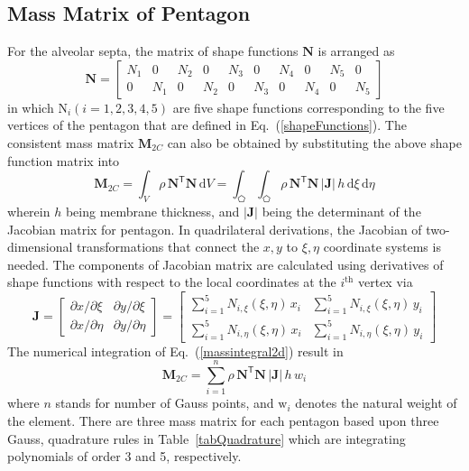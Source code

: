 \subsection{Mass Matrix of Pentagon}
For the alveolar septa, the matrix of shape functions $\mathbf{N}$ is arranged as
 \begin{equation}
	\mathbf{N} = 
	\begin{bmatrix}
	N_1 & 0 & N_2 & 0 & N_3 & 0 & N_4 & 0 & N_5 & 0 \\ 0 & N_1 & 0 & N_2 & 0 & N_3 & 0 & N_4 & 0 & N_5 
\end{bmatrix} 
	\label{shape2D}
\end{equation}
in which $\mathrm{N}_i (i = 1, 2, 3, 4, 5)$ are five shape functions corresponding to the five vertices of the pentagon that are defined in Eq.~(\ref{shapeFunctions}).
The consistent mass matrix $\mathbf{M}_{2C}$ can also be obtained by substituting the above shape function matrix into 
\begin{equation}
    \mathbf{M}_{2C} = \int_{V} \rho \, \mathbf{N}^{\mathsf{T}} \mathbf{N} \, \mathrm{d} V = \int_{\pentagon} \int_{\pentagon} \rho \, \mathbf{N}^{\mathsf{T}} \mathbf{N} \,|\mathbf{J}| \, h \, \mathrm{d} \xi \, \mathrm{d} \eta
    \label{massintegral2d}
\end{equation}
wherein $h$ being membrane thickness, and $|\mathbf{J}|$ being the determinant of the Jacobian matrix for pentagon. 
In quadrilateral derivations,  the Jacobian of two-dimensional transformations that connect the ${x, y}$ to ${\xi, \eta}$ coordinate systems is needed. The components of Jacobian matrix are calculated using derivatives of shape functions with respect to the local coordinates at the $i^{\mathrm{th}}$ vertex via
\begin{equation}
\mathbf{J} = 
\begin{bmatrix}
\partial x / \partial\xi & \partial y / \partial\xi \\
\partial x / \partial\eta & \partial y / \partial\eta 
\end{bmatrix}  
= \begin{bmatrix}
\sum\nolimits_{i=1}^5 N_{i,\xi} (\xi,\eta) \, x_i & \sum\nolimits_{i=1}^5 N_{i,\xi} (\xi,\eta) \, y_i \\
\sum\nolimits_{i=1}^5 N_{i,\eta} (\xi,\eta) \, x_i & \sum\nolimits_{i=1}^5 N_{i,\eta} (\xi,\eta) \, y_i
\end{bmatrix}
\label{jacobianpent}
\end{equation}
The numerical integration of Eq.~(\ref{massintegral2d}) result in 
\begin{equation}
    \mathbf{M}_{2C} = \sum_{i=1}^{n} \rho \, \mathbf{N}^{\mathsf{T}} \mathbf{N} \,|\mathbf{J}| \, h \, w_i
\end{equation}
where $n$ stands for number of Gauss points, and $\mathrm{w}_i$ denotes the natural weight of the element.
There are three mass matrix for each pentagon based upon three Gauss, quadrature rules in Table~\ref{tabQuadrature} which are integrating polynomials of order 3 and 5, respectively. 

